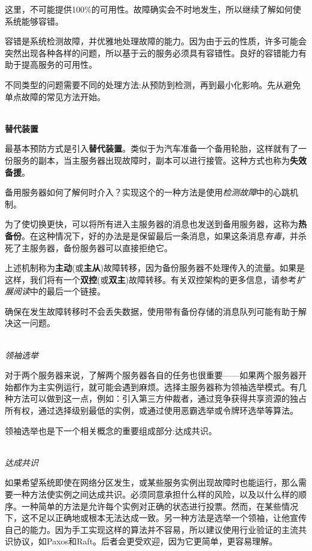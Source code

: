 这里，不可能提供100\%的可用性。故障确实会不时地发生，所以继续了解如何使系统能够容错。


容错是系统检测故障，并优雅地处理故障的能力。因为由于云的性质，许多可能会突然出现各种各样的问题，所以基于云的服务必须具有容错性。良好的容错能力有助于提高服务的可用性。

不同类型的问题需要不同的处理方法:从预防到检测，再到最小化影响。先从避免单点故障的常见方法开始。

\hspace*{\fill} \\ %
\noindent
\textbf{替代装置}

最基本预防方式是引入\textbf{替代装置}。类似于为汽车准备一个备用轮胎，这样就有了一份服务的副本，当主服务器出现故障时，副本可以进行接管。这种方式也称为\textbf{失效备援}。

备用服务器如何了解何时介入？实现这个的一种方法是使用\textit{检测故障}中的心跳机制。

为了使切换更快，可以将所有进入主服务器的消息也发送到备用服务器，这称为\textbf{热备份}。在这种情况下，好的办法是是保留最后一条消息，如果这条消息\textit{有毒}，并杀死了主服务器，备份服务器可以直接拒绝它。

上述机制称为\textbf{主动}(或\textbf{主从})故障转移，因为备份服务器不处理传入的流量。如果是这样，我们将有一个\textbf{双控}(或\textbf{双主})故障转移。有关双控架构的更多信息，请参考\textit{扩展阅读}中的最后一个链接。

确保在发生故障转移时不会丢失数据，使用带有备份存储的消息队列可能有助于解决这一问题。

\hspace*{\fill} \\ %
\noindent
\textit{领袖选举}

对于两个服务器来说，了解两个服务器各自的任务也很重要——如果两个服务器开始都作为主实例运行，就可能会遇到麻烦。选择主服务器称为领袖选举模式。有几种方法可以做到这一点，例如：引入第三方仲裁者，通过竞争获得共享资源的独占所有权，通过选择级别最低的实例，或通过使用恶霸选举或令牌环选举等算法。

领袖选举也是下一个相关概念的重要组成部分:达成共识。

\hspace*{\fill} \\ %
\noindent
\textit{达成共识}

如果希望系统即使在网络分区发生，或某些服务实例出现故障时也能运行，那么需要一种方法使实例之间达成共识。必须同意承担什么样的风险，以及以什么样的顺序。一种简单的方法是允许每个实例对正确的状态进行投票。然而，在某些情况下，这不足以正确地或根本无法达成一致。另一种方法是选举一个领袖，让他宣传自己的能力。因为手工实现这样的算法并不容易，所以建议使用行业验证的主流共识协议，如Paxos和Raft。后者会更受欢迎，因为它更简单，更容易理解。

